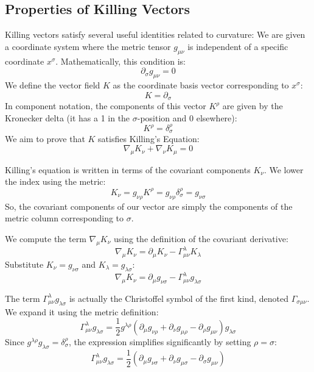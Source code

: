 \documentclass[11pt, a4paper]{report}
\begin{document}
\subsection*{Properties of Killing Vectors}
Killing vectors satisfy several useful identities related to curvature:
We are given a coordinate system where the metric tensor $g_{\mu\nu}$ is independent of a specific coordinate $x^\sigma$. Mathematically, this condition is:
\begin{equation}
    \partial_\sigma g_{\mu\nu} = 0 \label{eq:independence}
\end{equation}
We define the vector field $K$ as the coordinate basis vector corresponding to $x^\sigma$:
\begin{equation}
    K = \partial_\sigma
\end{equation}
In component notation, the components of this vector $K^\rho$ are given by the Kronecker delta (it has a 1 in the $\sigma$-position and 0 elsewhere):
\begin{equation}
    K^\rho = \delta^\rho_\sigma
\end{equation}
We aim to prove that $K$ satisfies Killing's Equation:
\begin{equation}
    \nabla_\mu K_\nu + \nabla_\nu K_\mu = 0
\end{equation}

Killing's equation is written in terms of the covariant components $K_\nu$. We lower the index using the metric:
\begin{equation}
    K_\nu = g_{\nu\rho} K^\rho = g_{\nu\rho} \delta^\rho_\sigma = g_{\nu\sigma}
\end{equation}
So, the covariant components of our vector are simply the components of the metric column corresponding to $\sigma$.

We compute the term $\nabla_\mu K_\nu$ using the definition of the covariant derivative:
\begin{equation}
    \nabla_\mu K_\nu = \partial_\mu K_\nu - \Gamma^\lambda_{\mu\nu} K_\lambda
\end{equation}
Substitute $K_\nu = g_{\nu\sigma}$ and $K_\lambda = g_{\lambda\sigma}$:
\begin{equation}
    \nabla_\mu K_\nu = \partial_\mu g_{\nu\sigma} - \Gamma^\lambda_{\mu\nu} g_{\lambda\sigma}
\end{equation}

The term $\Gamma^\lambda_{\mu\nu} g_{\lambda\sigma}$ is actually the Christoffel symbol of the first kind, denoted $\Gamma_{\sigma\mu\nu}$. We expand it using the metric definition:
\begin{equation}
    \Gamma^\lambda_{\mu\nu} g_{\lambda\sigma} = \frac{1}{2} g^{\lambda\rho} (\partial_\mu g_{\nu\rho} + \partial_\nu g_{\mu\rho} - \partial_\rho g_{\mu\nu}) g_{\lambda\sigma}
\end{equation}
Since $g^{\lambda\rho} g_{\lambda\sigma} = \delta^\rho_\sigma$, the expression simplifies significantly by setting $\rho = \sigma$:
\begin{equation}
    \Gamma^\lambda_{\mu\nu} g_{\lambda\sigma} = \frac{1}{2} (\partial_\mu g_{\nu\sigma} + \partial_\nu g_{\mu\sigma} - \partial_\sigma g_{\mu\nu})
\end{equation}
\end{document}
